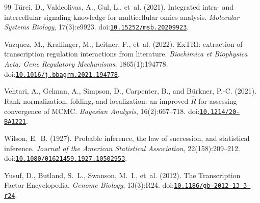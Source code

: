 \begin{thebibliography}{99}
T{\"u}rei, D., Valdeolivas, A., Gul, L., et~al. (2021).
\newblock Integrated intra- and intercellular signaling knowledge for multicellular omics analysis.
\newblock \emph{Molecular Systems Biology}, 17(3):e9923.
\newblock doi:\href{https://doi.org/10.15252/msb.20209923}{\nolinkurl{10.15252/msb.20209923}}.

Vazquez, M., Krallinger, M., Leitner, F., et~al. (2022).
\newblock ExTRI: extraction of transcription regulation interactions from literature.
\newblock \emph{Biochimica et Biophysica Acta: Gene Regulatory Mechanisms}, 1865(1):194778.
\newblock doi:\href{https://doi.org/10.1016/j.bbagrm.2021.194778}{\nolinkurl{10.1016/j.bbagrm.2021.194778}}.

Vehtari, A., Gelman, A., Simpson, D., Carpenter, B., and B{\"u}rkner, P.-C. (2021).
\newblock Rank-normalization, folding, and localization: an improved $\widehat{R}$ for assessing convergence of {MCMC}.
\newblock \emph{Bayesian Analysis}, 16(2):667--718.
\newblock doi:\href{https://doi.org/10.1214/20-BA1221}{\nolinkurl{10.1214/20-BA1221}}.

Wilson, E.~B. (1927).
\newblock Probable inference, the law of succession, and statistical inference.
\newblock \emph{Journal of the American Statistical Association}, 22(158):209--212.
\newblock doi:\href{https://doi.org/10.1080/01621459.1927.10502953}{\nolinkurl{10.1080/01621459.1927.10502953}}.

Yusuf, D., Butland, S.~L., Swanson, M.~I., et~al. (2012).
\newblock The Transcription Factor Encyclopedia.
\newblock \emph{Genome Biology}, 13(3):R24.
\newblock doi:\href{https://doi.org/10.1186/gb-2012-13-3-r24}{\nolinkurl{10.1186/gb-2012-13-3-r24}}.

\end{thebibliography}
